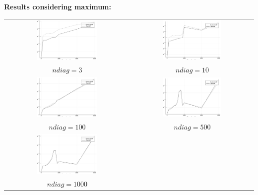 \documentclass[a4paper,11pt]{article}
\begin{document}
\newpage
\bf{Results considering maximum:}\\

\begin{tabular}{cc}
	\includegraphics[width=0.5\textwidth]{perf_maximum_3} & 
	\includegraphics[width=0.5\textwidth]{perf_maximum_10} \\
	$ndiag = 3$ & $ndiag = 10$\\
	\includegraphics[width=0.5\textwidth]{perf_maximum_100} &
	\includegraphics[width=0.5\textwidth]{perf_maximum_500} \\
	$ndiag = 100$ & $ndiag = 500$\\
	\includegraphics[width=0.5\textwidth]{perf_maximum_1000} & \\
	$ndiag = 1000$ & 
\end{tabular}
\end{document}
